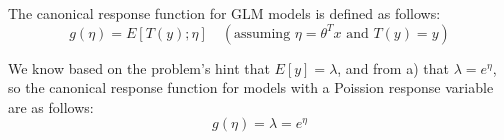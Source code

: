 \begin{answer}

The canonical response function for GLM models is defined as follows:
\[ g(\eta) = E[T(y); \eta] \quad (\text{assuming } \eta = \theta^T x \text{ and } T(y)=y) \]

We know based on the problem's hint that $E[y]=\lambda$, and from a) that $\lambda=e^\eta$, so the canonical response function for models with a Poission response variable are as follows:
\[ g(\eta) = \lambda = e^\eta \]

\end{answer}
